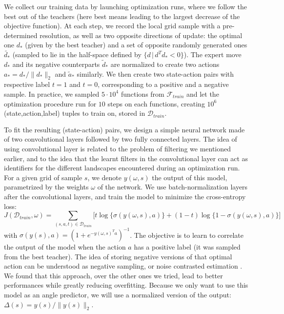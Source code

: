 	We collect our training data by launching optimization runs, where we follow the best out of the teachers (here best means leading to the largest decrease of the objective function). At each step, we record the local grid sample with a pre-determined resolution, as well as two opposite directions of update: the optimal one $d_*$ (given by the best teacher) and a set of opposite randomly generated ones $\tilde{d_*}$ (sampled to lie in the half-space defined by $\{ d\, \vert \, d^Td_* <0\}$). The expert move $d_*$ and its negative counterparts $\tilde{d}_*$ are normalized to create two actions $a_*= d_* / \lVert d_*\rVert_2$ and $\tilde{a}_*$ similarly. We then create two state-action pairs with respective label $t=1$ and $t=0$, corresponding to a positive and a negative sample. In practice, we sampled $5\cdot 10^4$ functions from $\mathcal{F}_{train}$ and let the optimization procedure run for $10$ steps on each functions, creating $10^6$ (state,action,label) tuples to train on, stored in $\mathcal{D}_{train}$.
			
	To fit the resulting (state-action) pairs, we design a simple neural network made of two convolutional layers followed by two fully connected layers. The idea of using convolutional layer is related to the problem of filtering we mentioned earlier, and to the idea that the learnt filters in the convolutional layer can act as identifiers for the different landscapes encountered during an optimization run. For a given grid of sample $s$, we denote $y(\omega,s)$ the output of this model, parametrized by the weights $\omega$ of the network. We use batch-normalization layers after the convolutional layers, and train the model to minimize the cross-entropy loss:
			\begin{equation}
				J(\mathcal{D}_{train},\omega) = \sum_{(s,a,t)\in\mathcal{D}_{train}} \Big[t\log{\{\sigma(y(\omega ,s),a)\}} + (1-t)\log{\{1-\sigma(y(\omega,s),a)\}}\Big]
			\end{equation}
			with $\sigma(y(s),a) = (1+e^{-y(\omega,s)^Ta})^{-1}$.
			The objective is to learn to correlate the output of the model when the action $a$ has a positive label (it was sampled from the best teacher). The idea of storing negative versions of that optimal action can be understood as negative sampling, or noise contrasted estimation \cite{gutmann2010noise}. We found that this approach, over the other ones we tried, lead to better performances while greatly reducing overfitting. Because we only want to use this model as an angle predictor, we will use a normalized version of the output: $\Delta(s) = y(s) / \rVert y(s) \lVert_2$.
	
